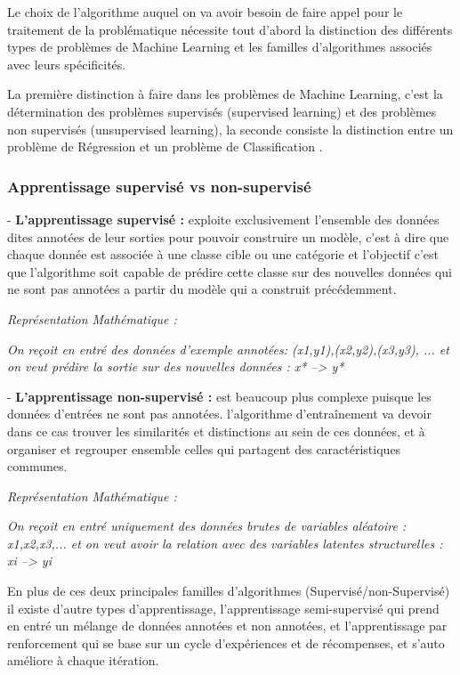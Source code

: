 Le choix de l'algorithme auquel  on va avoir besoin de faire appel pour le traitement de la problématique nécessite tout d'abord  la distinction des différents types de problèmes de Machine Learning et les familles d'algorithmes associés avec leurs spécificités.

La première distinction à faire dans les problèmes de Machine Learning, c'est la détermination des problèmes supervisés (supervised learning) et des problèmes non supervisés (unsupervised learning), la seconde consiste la distinction entre un problème de Régression et un problème de Classification \cite{ML}.

\subsubsection{Apprentissage supervisé vs non-supervisé}


- \textbf{L'apprentissage supervisé : }exploite exclusivement l'ensemble des données dites annotées de leur sorties pour pouvoir construire un modèle, c'est à dire que chaque donnée est associée à une classe cible ou une catégorie et l'objectif c'est que l'algorithme soit capable de prédire cette classe sur des nouvelles données qui ne sont pas annotées a partir du modèle qui a construit précédemment.

\textit{Représentation Mathématique : }
    
    \textit{On reçoit en entré des données d'exemple annotées:
    (x1,y1),(x2,y2),(x3,y3), ... et on veut prédire la sortie sur des nouvelles données :  x* --> y* }

- \textbf{L'apprentissage non-supervisé : } est beaucoup plus complexe puisque les données d'entrées ne sont pas annotées. l'algorithme d'entraînement va devoir dans ce cas  trouver  les similarités et distinctions au sein de ces données, et à organiser et regrouper ensemble celles qui partagent des caractéristiques communes.

\textit{Représentation Mathématique : }
    
   \textit{ On reçoit en entré uniquement des données brutes de variables aléatoire : x1,x2,x3,... et on veut avoir la relation avec des variables latentes structurelles :  xi --> yi }
    
En plus de ces deux principales familles d'algorithmes (Supervisé/non-Supervisé) il existe d'autre types d'apprentissage, l'apprentissage semi-supervisé qui prend en entré un mélange de données annotées et non annotées, et l'apprentissage par renforcement qui se base sur un cycle d'expériences et de récompenses, et s'auto améliore à chaque itération.

